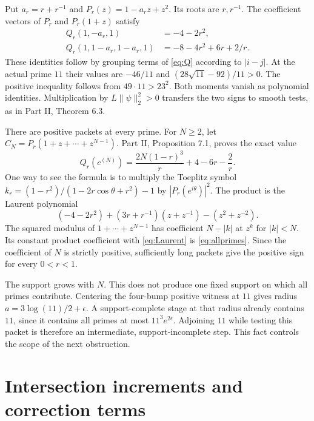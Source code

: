 \documentclass[11pt,letterpaper]{article}
\theoremstyle{definition}
\theoremstyle{remark}
\begin{document}
Put $a_r=r+r^{-1}$ and $P_r(z)=1-a_rz+z^2$.
Its roots are $r,r^{-1}$. The coefficient vectors of $P_r$
and $P_r(1+z)$ satisfy
\begin{align}
 Q_r(1,-a_r,1)&=-4-2r^2,\label{eq:Qminus}\\
 Q_r(1,1-a_r,1-a_r,1)&=-8-4r^2+6r+2/r.
 \label{eq:Qplus}
\end{align}
These identities follow by grouping terms of \eqref{eq:Q}
according to $|i-j|$. At the actual prime $11$ their values
are $-46/11$ and $(28\sqrt{11}-92)/11>0$. The positive
inequality follows from $49\cdot11>23^2$. Both moments vanish
as polynomial identities. Multiplication by
$L\|\psi\|_2^2>0$ transfers the two signs to smooth tests,
as in Part II, Theorem 6.3.

There are positive packets at every prime. For $N\ge2$, let
$C_N=P_r(1+z+\cdots+z^{N-1})$. Part II, Proposition 7.1,
proves the exact value
\begin{equation}
 Q_r(c^{(N)})=\frac{2N(1-r)^3}{r}+4-6r-\frac2r.
 \label{eq:allprimes}
\end{equation}
One way to see the formula is to multiply the Toeplitz symbol
$k_r=(1-r^2)/(1-2r\cos\theta+r^2)-1$ by $|P_r(e^{i\theta})|^2$.
The product is the Laurent polynomial
\begin{equation}
 (-4-2r^2)+(3r+r^{-1})(z+z^{-1})-(z^2+z^{-2}).
 \label{eq:Laurent}
\end{equation}
The squared modulus of $1+\cdots+z^{N-1}$ has coefficient
$N-|k|$ at $z^k$ for $|k|<N$. Its constant product coefficient
with \eqref{eq:Laurent} is \eqref{eq:allprimes}. Since the
coefficient of $N$ is strictly positive, sufficiently long
packets give the positive sign for every $0<r<1$.

The support grows with $N$. This does not produce one fixed
support on which all primes contribute. Centering the four-bump
positive witness at $11$ gives radius
$a=3\log(11)/2+\epsilon$. A support-complete stage at that
radius already contains $11$, since it contains all primes
at most $11^3e^{2\epsilon}$. Adjoining $11$ while testing this
packet is therefore an intermediate, support-incomplete step.
This fact controls the scope of the next obstruction.

\section{Intersection increments and correction terms}
\end{document}
